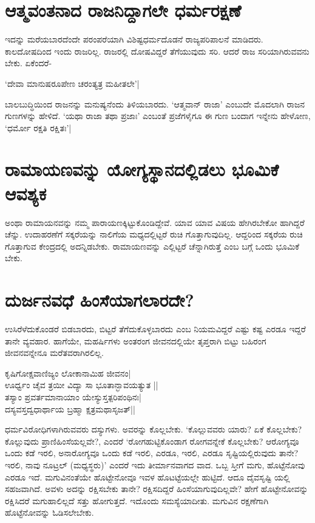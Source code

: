\section*{ಆತ್ಮವಂತನಾದ ರಾಜನಿದ್ದಾಗಲೇ ಧರ್ಮರಕ್ಷಣೆ}

ಇದನ್ನು ಮರೆಯಬಾರದೆಂದೇ ಪರಂಪರೆಯಾಗಿ ವಿಶಿಷ್ಟಧರ್ಮದೊಡನೆ ರಾಜ್ಯಪರಿಪಾಲನೆ ಮಾಡಿದರು. ಕಾಲದೋಷದಿಂದ ಇಂದು ರಾಜರಿಲ್ಲ. ರಾಜರಲ್ಲಿ ದೋಷವಿದ್ದರೆ ತೆಗೆಯುವುದು ಸರಿ. ಆದರೆ ರಾಜ ಸರಿಯಾಗಿರುವವನು ಬೇಕು. ಏಕೆಂದರೆ-

\begin{shloka}
`ದೇವಾ ಮಾನುಷರೂಪೇಣ ಚರಂತ್ಯತ್ರ ಮಹೀತಲೇ'|
\end{shloka}

ಬಾಲಬುದ್ಧಿಯಿಂದ ರಾಜನನ್ನು ಮನುಷ್ಯನೆಂದು ತಿಳಿಯಬಾರದು. `ಆತ್ಮವಾನ್ ರಾಜಾ' ಎಂಬುದೇ ಮೊದಲಾಗಿ ರಾಜನ ಗುಣಗಳನ್ನು ಹೇಳಿದೆ. `ಯಥಾ ರಾಜಾ ತಥಾ ಪ್ರಜಾಃ' ಎಂಬಂತೆ ಪ್ರಜೆಗಳೈಗೂ ಈ ಗುಣ ಬಂದಾಗ ಇನ್ನೇನು ಹೇಳೋಣ, `ಧರ್ಮೋ ರಕ್ಷತಿ ರಕ್ಷಿತಃ'|

\section*{ರಾಮಾಯಣವನ್ನು ಯೋಗ್ಯಸ್ಥಾನದಲ್ಲಿಡಲು ಭೂಮಿಕೆ ಆವಶ್ಯಕ}

ಅಂಥಾ ರಾಮಾಯನವನ್ನು ನಮ್ಮ ಪಾರಾಯಣಕ್ಕಿಟ್ಟುಕೊಂಡಿದ್ದೇವೆ. ಯಾವ ಯಾವ ವಿಷಯ ಹೇಗಿರಬೇಕೋ ಹಾಗಿದ್ದರೆ ಚೆನ್ನು. ಉದಾಹರಣೆಗೆ ಸಕ್ಕರೆಯನ್ನು ನಾಲಿಗೆಯ ಮಧ್ಯದಲ್ಲಿಟ್ಟರೆ ರುಚಿ ಗೊತ್ತಾಗುವುದಿಲ್ಲ. ಆದ್ದರಿಂದ ಸಕ್ಕರೆಯ ರುಚಿ ಗೊತ್ತಾಗುವ ಕೇಂದ್ರದಲ್ಲಿ ಅದನ್ನಿಡಬೇಕು. ರಾಮಾಯಣವನ್ನು ಎಲ್ಲಿಟ್ಟರೆ ಚೆನ್ನಾಗಿರುತ್ತೆ ಎಂಬ ಬಗ್ಗೆ ಒಂದು ಭೂಮಿಕೆ ಬೇಕು.

\section*{ದುರ್ಜನವಧೆ ಹಿಂಸೆಯಾಗಲಾರದೇ?}

ಉಸಿರೆಳೆದುಕೊಂಡರೆ ಬಿಡಬಾರದು, ಬಿಟ್ಟರೆ ತೆಗೆದುಕೊಳ್ಳಬಾರದು ಎಂಬ ನಿಯಮವಿದ್ದರೆ ಎಷ್ಟು ಕಷ್ಟ ಎರಡೂ ಇದ್ದರೆ ತಾನೇ ವ್ಯವಹಾರ. ಹಾಗೆಯೇ, ಮಹರ್ಷಿಗಳು ಅಂತರಂಗ ಜೀವನದಲ್ಲಿಯೇ ತೃಪ್ತರಾಗಿ ಬಿಟ್ಟು ಬಹಿರಂಗ ಜೀವನವನ್ನೇನೂ ಮರೆತವರಾಗಿರಲಿಲ್ಲ.

\begin{shloka}
ಕೃಷಿಗೋಕ್ಷವಾಣಿಜ್ಯಂ ಲೋಕಾನಾಮಿಹ ಜೀವನಂ|\\
ಊರ್ಧ್ವಂ ಚೈವ ತ್ರಯೀ ವಿದ್ಯಾ ಸಾ‌ ಭೂತಾನ್ಭಾವಯತ್ಯುತ ||\\
ತಸ್ಯಾಂ ಪ್ರವರ್ತಮಾನಾಯಾಂ ಯೇಸ್ಯುಸ್ತತ್ಪರಿಪಂಥಿನಃ|\\
ದಸ್ಯವಸ್ತದ್ವಧಾರ್ಥಾಯ ಬ್ರಹ್ಮಾ ಕ್ಷತ್ರಮಥಾಸೃಜತ್||
\end{shloka}
ಧರ್ಮವಿರೋಧಿಗಳಾಗಿರುವವರು ದಸ್ಯುಗಳು. ಅವರನ್ನು ಕೊಲ್ಲಬೇಕು. `ಕೊಲ್ಲುವವರು ಯಾರು? ಏಕೆ ಕೊಲ್ಲಬೇಕು? ಕೊಲ್ಲುವುದು ಪ್ರಾಣಿಹಿಂಸೆಯಲ್ಲವೇ?, ಎಂದರೆ `ರೋಗಹುಟ್ಟಿಕೊಂಡಾಗ ರೋಗವನ್ನೇಕೆ ಕೊಲ್ಲಬೇಕು? ಆರೋಗ್ಯವೂ ಒಂದು ಕಡೆ ಇರಲಿ, ಅನಾರೋಗ್ಯವೂ ಒಂದು ಕಡೆ ಇರಲಿ, ಎರಡೂ, ಇರಲಿ, ಎರಡೂ ಸೃಷ್ಟಿಯಲ್ಲಿರುವುದು ತಾನೇ? ಇರಲಿ, ನಾವು ನೂಟ್ರಲ್ (ಮಧ್ಯಸ್ಥರು)' ಎಂದರೆ ಇದು ತೀರ್ಮಾನವಾಗದ ವಾದ. ಒಬ್ಬ ಸ್ತೀಗೆ ಮಗು, ಹೊಟ್ಟೆನೋವು ಎರಡೂ ಇದೆ. ಮಗುವಿನಂತೆಯೇ ಹೊಟ್ಟೇನೋವೂ ಇವಳ ಹೊಟಟ್ಟೆಯಲ್ಲೇ ಹುಟ್ಟಿದೆ. ಆದೂ ದೈವಸೃಷ್ಟಿ ಯಲ್ಲಿ ಸಹಜವಾಗಿದೆ. ಅವಳು ಅದನ್ನು ರಕ್ಷಿಸಬೇಕು ತಾನೇ? ರಕ್ಷಿಸದಿದ್ದರೆ ಹಿಂಸೆಯಾಗುವುದಿಲ್ಲವೇ? ಹೇಗೆ ಹೊಟ್ಟೇನೋವನ್ನು ರಕ್ಷಿಸಿದರೆ ಮಗುಹಾಲಿಲ್ಲದೆ ಸತ್ತು ಹೋಗುತ್ತದೆ. ಇದೊಂದು ಸಮಸ್ಯೆಯಾದೀತು. ಮಗುವಿನ ರಕ್ಷಣೆಗಾಗಿ ಹೊಟ್ಟೆನೋವನ್ನು ಓಡಿಸಲೇಬೇಕು.

